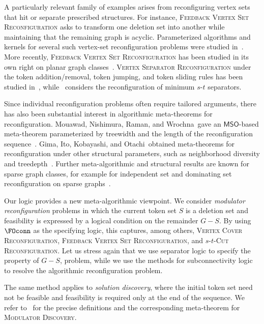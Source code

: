 \documentclass[1p,number,11pt]{elsarticle}
\theoremstyle{plain}
\newcommand{\MSO}{\ensuremath{\mathsf{MSO}}}
\begin{document}
A particularly relevant family of examples arises from reconfiguring vertex sets that hit or separate prescribed structures. 
For instance, \textsc{Feedback Vertex Set Reconfiguration} asks to transform one deletion set into another while maintaining that the remaining graph is acyclic.
Parameterized algorithms and kernels for several such vertex-set reconfiguration problems were studied in~\cite{journals/algorithmica/MouawadN0SS17}. 
More recently, \textsc{Feedback Vertex Set Reconfiguration} has been studied in its own right on planar graph classes~\cite{journals/tcs/BousquetHKMS23}. 
\textsc{Vertex Separator Reconfiguration} under the token addition/removal, token jumping, and token sliding rules has been studied in~\cite{journals/rairo-ro/GomesNS25}, while~\cite{journals/jcss/GomesLMMOSZ24} considers the reconfiguration of minimum $s$-$t$ separators.

Since individual reconfiguration problems often require tailored arguments, there has also been substantial interest in algorithmic meta-theorems for reconfiguration. Mouawad, Nishimura, Raman, and Wrochna\ gave an $\MSO$-based meta-theorem parameterized by treewidth and the length of the reconfiguration sequence~\cite{conf/iwpec/MouawadNRW14}.
Gima, Ito, Kobayashi, and  Otachi\ obtained meta-theorems for reconfiguration under other structural parameters, such as neighborhood diversity and treedepth~\cite{conf/esa/GimaIKO22}. 
Further meta-algorithmic and structural results are known for sparse graph classes, for example for independent set and dominating set reconfiguration on sparse graphs~\cite{journals/jcss/LokshtanovMPRS18,journals/combinatorics/Siebertz18}.

Our logic provides a new meta-algorithmic viewpoint. We consider
\emph{modulator reconfiguration} problems in which the current token set
$S$ is a deletion set and feasibility is expressed by a logical condition
on the remainder $G-S$. By using $\FOconn$ as the specifying logic, this captures, among others, \textsc{Vertex Cover
Reconfiguration}, \textsc{Feedback Vertex Set Reconfiguration}, and
 \textsc{$s$-$t$-Cut Reconfiguration}.
Let us stress again that we use separator logic to specify the property of $G-S$, problem, while we use the methods for subconnectivity logic to resolve the algorithmic reconfiguration problem. 


The same method applies to \emph{solution discovery}, where the initial token set need not be feasible and feasibility is required only at the end of the sequence. We refer to~ for the precise definitions and the corresponding meta-theorem for \textsc{Modulator Discovery}.
\end{document}
